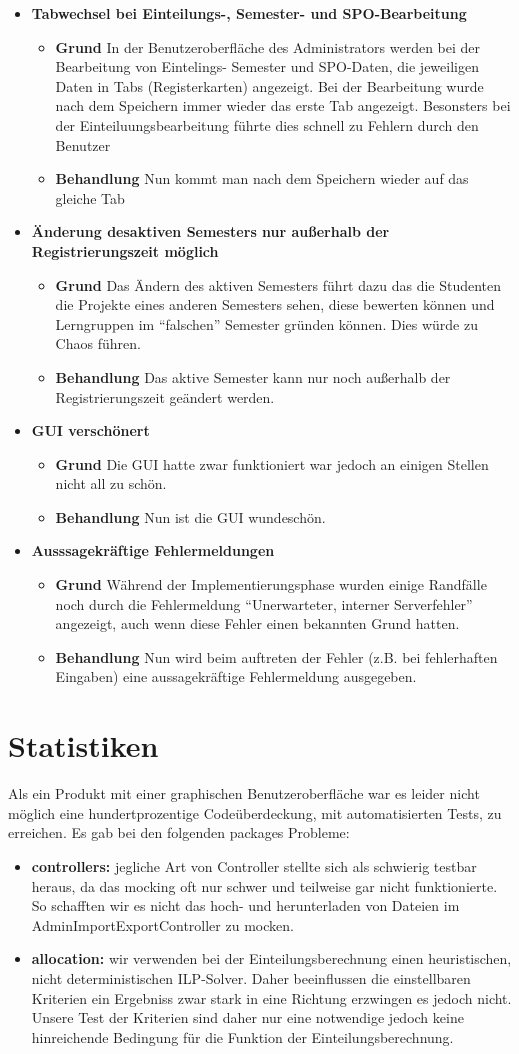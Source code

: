 \documentclass[parskip=full]{scrartcl}
\newcommand{\verbesserung}[3]{\textbf{#1}
 							\begin{itemize}
 							  
 							  \item \textbf{Grund} #2
 							  \item \textbf{Behandlung} #3
 							\end{itemize}}
\newcommand{\code}[1]{{\ttfamily #1}}
\begin{document}
\begin{itemize}
\item \verbesserung{Tabwechsel bei Einteilungs-, Semester- und
SPO-Bearbeitung}{In der Benutzeroberfläche des Administrators werden bei der
Bearbeitung von Eintelings- Semester und SPO-Daten, die jeweiligen Daten in
Tabs (Registerkarten) angezeigt. Bei der Bearbeitung wurde nach dem Speichern
immer wieder das erste Tab angezeigt. Besonsters bei der
Einteiluungsbearbeitung führte dies schnell zu Fehlern durch den Benutzer}{Nun
kommt man nach dem Speichern wieder auf das gleiche Tab}
\item \verbesserung{Änderung desaktiven Semesters nur außerhalb der
Registrierungszeit möglich}{Das Ändern des aktiven Semesters führt dazu das
die Studenten die Projekte eines anderen Semesters sehen, diese bewerten
können und Lerngruppen im \enquote{falschen} Semester gründen können. Dies
würde zu Chaos führen.}{Das aktive Semester kann nur noch außerhalb der
Registrierungszeit geändert werden.}
\item \verbesserung{GUI verschönert}{Die GUI hatte zwar funktioniert war
jedoch an einigen Stellen nicht all zu schön.}{Nun ist die GUI wundeschön.}%
\item \verbesserung{Ausssagekräftige Fehlermeldungen}{Während der
Implementierungsphase wurden einige Randfälle noch durch die Fehlermeldung
\enquote{Unerwarteter, interner Serverfehler} angezeigt, auch wenn diese
Fehler einen bekannten Grund hatten.}{Nun wird beim auftreten der Fehler (z.B.
bei fehlerhaften Eingaben) eine aussagekräftige Fehlermeldung ausgegeben. }
\end{itemize}
\section{Statistiken}
Als ein Produkt mit einer graphischen Benutzeroberfläche war es leider nicht
möglich eine hundertprozentige Codeüberdeckung, mit automatisierten Tests, zu
erreichen. Es gab bei den folgenden packages Probleme:
\begin{itemize}
  \item \textbf{\code{controllers:}} jegliche Art von Controller stellte sich
  als schwierig testbar heraus, da das mocking oft nur schwer und teilweise gar
  nicht funktionierte. So schafften wir es nicht das hoch- und herunterladen von
  Dateien im \code{AdminImportExportController} zu mocken.
  \item \textbf{\code{allocation:}} wir verwenden bei der Einteilungsberechnung
  einen heuristischen, nicht deterministischen ILP-Solver. Daher beeinflussen
  die einstellbaren Kriterien ein Ergebniss zwar stark in eine Richtung
  erzwingen es jedoch nicht. Unsere Test der Kriterien sind daher nur eine
  notwendige jedoch keine hinreichende Bedingung für die Funktion der
  Einteilungsberechnung. 
\end{itemize}
\end{document}
